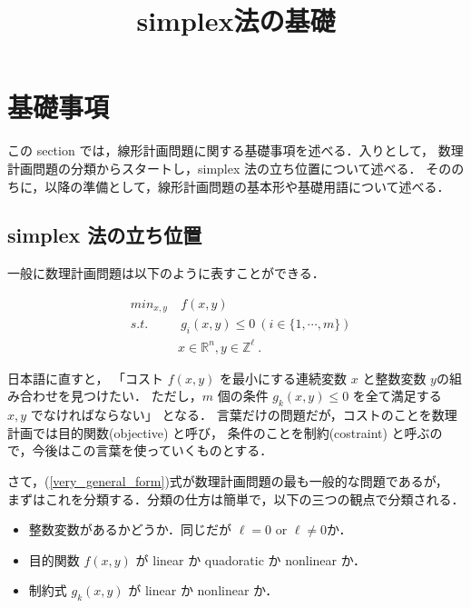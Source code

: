 \documentclass[11pt, a4]{article}
\title{simplex法の基礎}
\begin{document}
\maketitle

\section{基礎事項}
この section では，線形計画問題に関する基礎事項を述べる．入りとして，
数理計画問題の分類からスタートし，simplex 法の立ち位置について述べる．
そののちに，以降の準備として，線形計画問題の基本形や基礎用語について述べる．

\subsection{simplex 法の立ち位置}
一般に数理計画問題は以下のように表すことができる．

\begin{eqnarray}
  &min_{x, y}&\  f(x, y)\nonumber\\
  &s.t.&\ g_i(x, y) \leq 0\ (i \in \{1, \cdots, m\})\nonumber\\
  &\ & x\in \mathbb{R}^n, y \in \mathbb{Z}^{\ell}\ .
  \label{very_general_form}
\end{eqnarray}

日本語に直すと，
「コスト $f(x, y)$ を最小にする連続変数 $x$ と整数変数 $y$の組み合わせを見つけたい．
  ただし，$m$ 個の条件 $g_k(x,y) \leq 0$ を全て満足する $x, y$ でなければならない」
となる．
言葉だけの問題だが，コストのことを数理計画では目的関数(objective) と呼び，
条件のことを制約(costraint) と呼ぶので，今後はこの言葉を使っていくものとする．

さて，(\ref{very_general_form})式が数理計画問題の最も一般的な問題であるが，
まずはこれを分類する．分類の仕方は簡単で，以下の三つの観点で分類される．
\begin{itemize}
\item 整数変数があるかどうか．同じだが $\ell = 0$ or $\ell\neq 0$か．
\item 目的関数 $f(x, y)$ が linear か quadoratic か nonlinear か．
\item 制約式 $g_k(x, y)$ が linear か nonlinear か．
\end{itemize}
\end{document}
